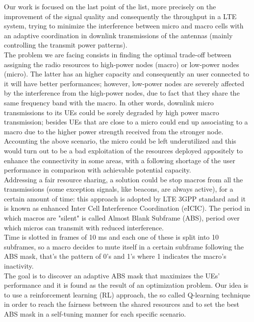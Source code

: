 \documentclass[conference,10pt]{IEEEtran}
\begin{document}
Our work is focused on the last point of the list, more precisely on the improvement of the signal quality and consequently the throughput in a LTE system, trying to minimize the interference between micro and macro cells with an adaptive coordination in downlink transmissions of the antennas (mainly controlling the transmit power patterns).\\
The problem we are facing consists in finding the optimal trade-off between assigning  the radio resources to high-power nodes (macro) or low-power nodes (micro). The latter has an higher capacity and consequently an user connected to it will have better performances; however, low-power nodes are severely affected by the interference from the high-power nodes, due to fact that they share the same frequency band with the macro. In other words, downlink micro transmissions to its UEs could be sorely degraded by high power macro transmission; besides UEs that are close to a micro could end up associating to a macro due to the higher power strength received from the stronger node.\\
Accounting the above scenario, the micro could be left underutilized and this would turn out to be a bad exploitation of the resources deployed appositely to enhance the connectivity in some areas, with a following shortage of the user performance in comparison with achievable potential capacity.\\
Addressing a fair resource sharing, a solution could be stop macros from all the transmissions (some exception signals, like beacons, are always active), for a certain amount of time: this approach is adopted by LTE 3GPP standard and it is known as enhanced Inter Cell Interference Coordination (eICIC). The period in which macros are "silent" is called Almost Blank Subframe (ABS), period over which micros can transmit with reduced interference.\\
Time is slotted in frames of 10 ms and each one of these is split into 10 subframes, so a macro decides to mute itself in a certain subframe following the ABS mask, that's the pattern of 0's and 1's where 1 indicates the macro's inactivity.\\
The goal is to discover an adaptive ABS mask that maximizes the UEs' performance and it is found as the result of an optimization problem. Our idea is to use a reinforcement learning (RL) approach, the so called Q-learning technique in order to reach the fairness between the shared resources and to set the best ABS mask in a self-tuning manner for each specific scenario.\\
\end{document}
